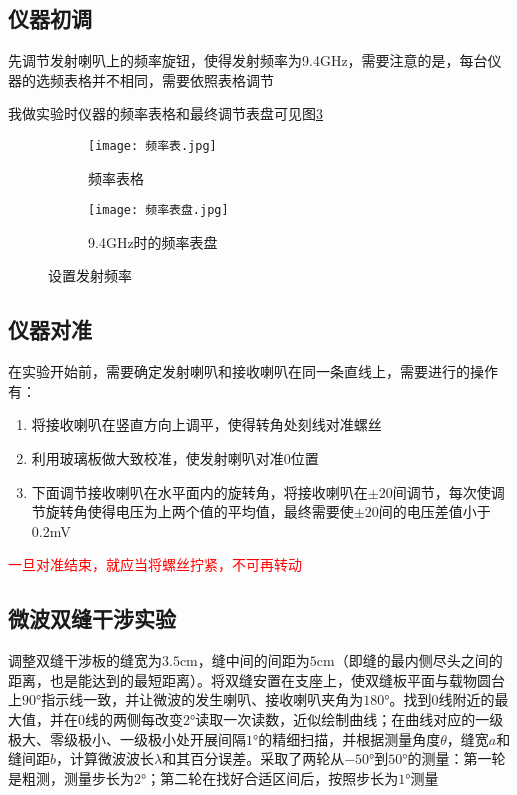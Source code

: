 \documentclass[11pt]{article}
\begin{document}
	
	\subsection{仪器初调}
	先调节发射喇叭上的频率旋钮，使得发射频率为9.4GHz，需要注意的是，每台仪器的选频表格并不相同，需要依照表格调节
	
	我做实验时仪器的频率表格和最终调节表盘可见图\ref{fig:frequency set}
	
	\begin{figure}[htbp]
		\centering
		\begin{subfigure}[t]{0.45\textwidth}  %
			\centering
			\texttt{[image: 频率表.jpg]}  %
			\caption{频率表格}
			\label{fig:frequency table}
		\end{subfigure}
		\begin{subfigure}[t]{0.45\textwidth}  %
			\centering
			\texttt{[image: 频率表盘.jpg]}  %
			\caption{9.4GHz时的频率表盘}
			\label{fig:frequency ratio}
		\end{subfigure}
		\caption{设置发射频率}
		\label{fig:frequency set}
	\end{figure}
	
		
	\subsection{仪器对准}
	在实验开始前，需要确定发射喇叭和接收喇叭在同一条直线上，需要进行的操作有：
	\begin{enumerate}
		\item 将接收喇叭在竖直方向上调平，使得转角处刻线对准螺丝
		\item 利用玻璃板做大致校准，使发射喇叭对准0\textdegree 位置
		\item 下面调节接收喇叭在水平面内的旋转角，将接收喇叭在$\pm 20$\textdegree 间调节，每次使调节旋转角使得电压为上两个值的平均值，最终需要使$\pm 20$\textdegree 间的电压差值小于0.2mV
	\end{enumerate}
	
	\textcolor{red}{一旦对准结束，就应当将螺丝拧紧，不可再转动}
	
	
	\subsection{微波双缝干涉实验}
	
	调整双缝干涉板的缝宽为$3.5$cm，缝中间的间距为$5$cm（即缝的最内侧尽头之间的距离，也是能达到的最短距离）。将双缝安置在支座上，使双缝板平面与载物圆台上$90$°指示线一致，并让微波的发生喇叭、接收喇叭夹角为$180$°。找到$0$线附近的最大值，并在$0$线的两侧每改变$2$°读取一次读数，近似绘制曲线；在曲线对应的一级极大、零级极小、一级极小处开展间隔$1$°的精细扫描，并根据测量角度$\theta$，缝宽$a$和缝间距$b$，计算微波波长$\lambda$和其百分误差。采取了两轮从$-50$°到$50$°的测量：第一轮是粗测，测量步长为$2$°；第二轮在找好合适区间后，按照步长为$1$°测量
	
\end{document}
